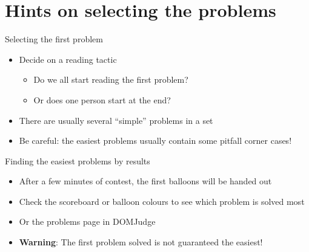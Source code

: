 \documentclass[11pt,pdf, aspectratio=169]{beamer}
\begin{document}
  \section{Hints on selecting the problems}
  \begin{frame}{Selecting the first problem}
    \begin{itemize}
      \item Decide on a reading tactic
      \begin{itemize}
        \item Do we all start reading the first problem?
        \item Or does one person start at the end?
      \end{itemize}
      \item There are usually several ``simple'' problems in a set
      \item Be careful: the easiest problems usually contain some pitfall corner cases!
    \end{itemize}
  \end{frame}
  \begin{frame}{Finding the easiest problems by results}
    \begin{itemize}
      \item After a few minutes of contest, the first balloons will be handed out
      \item Check the scoreboard or balloon colours to see which problem is solved most %
      \item Or the problems page in DOMJudge %
      \item \textbf{Warning}: The first problem solved is not guaranteed the easiest!
    \end{itemize}
  \end{frame}
\end{document}
